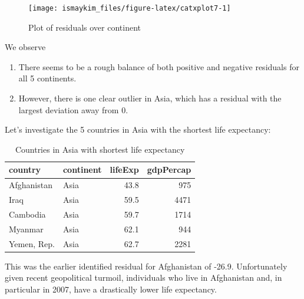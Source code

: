 \documentclass[12pt, krantz2,]{krantz}
\makeatletter
\newenvironment{Shaded}{\begin{snugshade}}{\end{snugshade}}
\newcommand{\KeywordTok}[1]{\textcolor[rgb]{0.27,0.27,0.27}{\textbf{#1}}}
\newcommand{\NormalTok}[1]{#1}
\newcommand{\OperatorTok}[1]{\textcolor[rgb]{0.43,0.43,0.43}{\textbf{#1}}}
\newcommand{\StringTok}[1]{\textcolor[rgb]{0.5,0.5,0.5}{#1}}
\providecommand{\tightlist}{%
  \setlength{\itemsep}{0pt}\setlength{\parskip}{0pt}}
\newenvironment{kframe}{%
\medskip{}
\setlength{\fboxsep}{.8em}
 \def\at@end@of@kframe{}%
 \ifinner\ifhmode%
  \def\at@end@of@kframe{\end{minipage}}%
  \begin{minipage}{\columnwidth}%
 \fi\fi%
 \def\FrameCommand##1{\hskip\@totalleftmargin \hskip-\fboxsep
 \colorbox{shadecolor}{##1}\hskip-\fboxsep
     \hskip-\linewidth \hskip-\@totalleftmargin \hskip\columnwidth}%
 \MakeFramed {\advance\hsize-\width
   \@totalleftmargin\z@ \linewidth\hsize
   \@setminipage}}%
 {\par\unskip\endMakeFramed%
 \at@end@of@kframe}
\renewenvironment{Shaded}{\begin{kframe}}{\end{kframe}}
\makeatother
\begin{document}
\begin{figure}

{\centering \texttt{[image: ismaykim\_files/figure-latex/catxplot7-1]} 

}

\caption{Plot of residuals over continent}\label{fig:catxplot7}
\end{figure}

We observe

\begin{enumerate}
\def\labelenumi{\arabic{enumi}.}
\tightlist
\item
  There seems to be a rough balance of both positive and negative residuals for all 5 continents.
\item
  However, there is one clear outlier in Asia, which has a residual with the largest deviation away from 0.
\end{enumerate}

Let's investigate the 5 countries in Asia with the shortest life expectancy:

\begin{Shaded}
\end{Shaded}

\begin{table}[H]

\caption{\label{tab:unnamed-chunk-410}Countries in Asia with shortest life expectancy}
\centering
\fontsize{10}{12}\selectfont
\begin{tabular}{llrr}
\toprule
country & continent & lifeExp & gdpPercap\\
\midrule
Afghanistan & Asia & 43.8 & 975\\
Iraq & Asia & 59.5 & 4471\\
Cambodia & Asia & 59.7 & 1714\\
Myanmar & Asia & 62.1 & 944\\
Yemen, Rep. & Asia & 62.7 & 2281\\
\bottomrule
\end{tabular}
\end{table}

This was the earlier identified residual for Afghanistan of -26.9. Unfortunately
given recent geopolitical turmoil, individuals who live in Afghanistan and, in particular in 2007, have a
drastically lower life expectancy.
\end{document}
